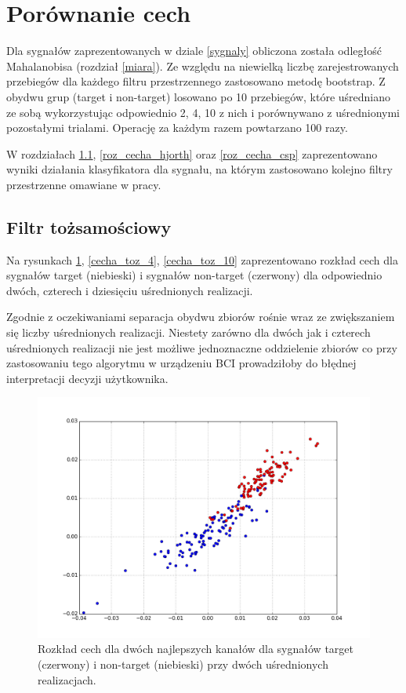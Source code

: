 \documentclass[licencjacka,openright]{pracamgr}
\begin{document}
\section{Porównanie cech}
\label{porownanie_cech}
Dla sygnałów zaprezentowanych w dziale \ref{sygnaly} obliczona została odległość Mahalanobisa (rozdział \ref{miara}). Ze względu na niewielką liczbę zarejestrowanych przebiegów dla każdego filtru przestrzennego zastosowano metodę bootstrap. Z obydwu grup (target i non-target) losowano po 10 przebiegów, które uśredniano ze sobą wykorzystując odpowiednio 2, 4, 10 z nich i porównywano z uśrednionymi pozostałymi trialami. Operację za każdym razem powtarzano 100 razy.

W rozdziałach \ref{roz_cecha_toz}, \ref{roz_cecha_hjorth} oraz \ref{roz_cecha_csp} zaprezentowano wyniki działania klasyfikatora dla sygnału, na którym zastosowano kolejno filtry przestrzenne omawiane w pracy.

\subsection{Filtr tożsamościowy}
\label{roz_cecha_toz}
Na rysunkach \ref{cecha_toz_2}, \ref{cecha_toz_4}, \ref{cecha_toz_10} zaprezentowano rozkład cech dla sygnałów target (niebieski) i sygnałów non-target (czerwony) dla odpowiednio dwóch, czterech i dziesięciu uśrednionych realizacji.

Zgodnie z oczekiwaniami separacja obydwu zbiorów rośnie wraz ze zwiększaniem się liczby uśrednionych realizacji. Niestety zarówno dla dwóch jak i czterech uśrednionych realizacji nie jest możliwe jednoznaczne oddzielenie zbiorów co przy zastosowaniu tego algorytmu w urządzeniu BCI prowadziłoby do błędnej interpretacji decyzji użytkownika.


\begin{figure}[H]
\centering
\includegraphics[scale=0.55, trim=10mm 15mm 10mm 18mm, clip=True]{pics/cecha_toz_2.png}
\caption{Rozkład cech dla dwóch najlepszych kanałów dla sygnałów target (czerwony) i non-target (niebieski) przy dwóch uśrednionych realizacjach.}
\label{cecha_toz_2}
\end{figure}
\end{document}
